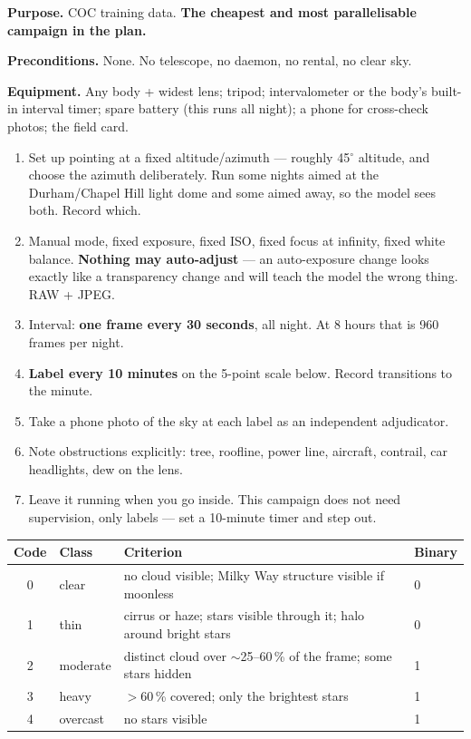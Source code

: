 \documentclass[11pt]{article}
\begin{document}
\textbf{Purpose.} COC training data. \textbf{The cheapest and most parallelisable
campaign in the plan.}

\textbf{Preconditions.} None. No telescope, no daemon, no rental, no clear sky.

\textbf{Equipment.} Any body + widest lens; tripod; intervalometer or the
body's built-in interval timer; spare battery (this runs all night); a phone for
cross-check photos; the field card.

\begin{enumerate}
\item Set up pointing at a fixed altitude/azimuth --- roughly 45$^\circ$
      altitude, and choose the azimuth deliberately. Run some nights aimed at
      the Durham/Chapel Hill light dome and some aimed away, so the model sees
      both. Record which.
\item Manual mode, fixed exposure, fixed ISO, fixed focus at infinity, fixed
      white balance. \textbf{Nothing may auto-adjust} --- an auto-exposure
      change looks exactly like a transparency change and will teach the model
      the wrong thing. RAW + JPEG.
\item Interval: \textbf{one frame every 30 seconds}, all night. At 8 hours
      that is 960 frames per night.
\item \textbf{Label every 10 minutes} on the 5-point scale below. Record
      transitions to the minute.
\item Take a phone photo of the sky at each label as an independent
      adjudicator.
\item Note obstructions explicitly: tree, roofline, power line, aircraft,
      contrail, car headlights, dew on the lens.
\item Leave it running when you go inside. This campaign does not need
      supervision, only labels --- set a 10-minute timer and step out.
\end{enumerate}

\begin{center}
\small
\begin{tabular}{@{}clll@{}}
\toprule
\textbf{Code} & \textbf{Class} & \textbf{Criterion} & \textbf{Binary} \\
\midrule
0 & clear     & no cloud visible; Milky Way structure visible if moonless & 0 \\
1 & thin      & cirrus or haze; stars visible through it; halo around bright stars & 0 \\
2 & moderate  & distinct cloud over $\sim$25--60\,\% of the frame; some stars hidden & 1 \\
3 & heavy     & $>$60\,\% covered; only the brightest stars & 1 \\
4 & overcast  & no stars visible & 1 \\
\bottomrule
\end{tabular}
\end{center}
\end{document}
